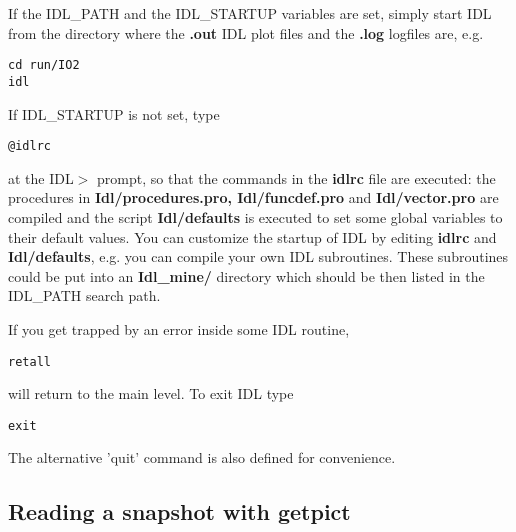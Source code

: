    If the IDL\_PATH and the IDL\_STARTUP variables are set, simply 
   start IDL from the directory where the {\bf *.out} IDL plot files
   and the {\bf *.log} logfiles are, e.g.
\begin{verbatim}
cd run/IO2
idl
\end{verbatim}
   If IDL\_STARTUP is not set, type
\begin{verbatim}
@idlrc
\end{verbatim}
   at the IDL$>$ prompt, so that the commands in the {\bf idlrc} file are
   executed: 
   the procedures in {\bf Idl/procedures.pro, Idl/funcdef.pro} and 
   {\bf Idl/vector.pro} are compiled and 
   the script {\bf Idl/defaults} is executed to set some
   global variables to their default values. You can customize the startup
   of IDL by editing {\bf idlrc} and {\bf Idl/defaults}, e.g. you can
   compile your own IDL subroutines. These subroutines could be put into an 
   {\bf Idl\_mine/} directory which should be then listed in the 
   IDL\_PATH search path.

   If you get trapped by an error inside some IDL routine,
\begin{verbatim}
retall
\end{verbatim}
   will return to the main level. To exit IDL type
\begin{verbatim}
exit
\end{verbatim}
   The alternative 'quit' command is also defined for convenience.

\subsection{Reading a snapshot with getpict \label{s-getpict}}

